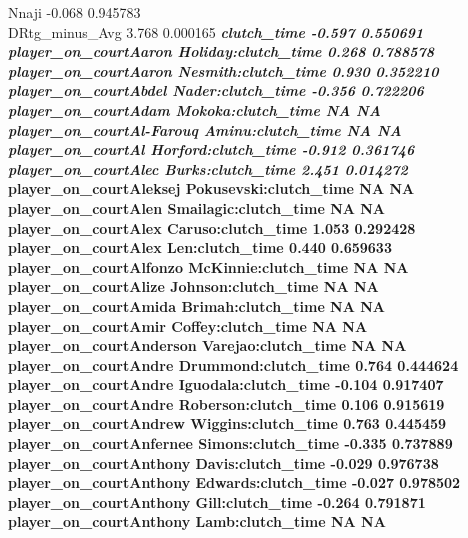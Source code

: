 \documentclass[
  landscape]{article}
\begin{document}
Nnaji -0.068 0.945783\\
DRtg\_minus\_Avg 3.768 0.000165 \textbf{\emph{ clutch\_time -0.597
0.550691\\
player\_on\_courtAaron Holiday:clutch\_time 0.268 0.788578\\
player\_on\_courtAaron Nesmith:clutch\_time 0.930 0.352210\\
player\_on\_courtAbdel Nader:clutch\_time -0.356 0.722206\\
player\_on\_courtAdam Mokoka:clutch\_time NA NA\\
player\_on\_courtAl-Farouq Aminu:clutch\_time NA NA\\
player\_on\_courtAl Horford:clutch\_time -0.912 0.361746\\
player\_on\_courtAlec Burks:clutch\_time 2.451 0.014272 }\\
player\_on\_courtAleksej Pokusevski:clutch\_time NA NA\\
player\_on\_courtAlen Smailagic:clutch\_time NA NA\\
player\_on\_courtAlex Caruso:clutch\_time 1.053 0.292428\\
player\_on\_courtAlex Len:clutch\_time 0.440 0.659633\\
player\_on\_courtAlfonzo McKinnie:clutch\_time NA NA\\
player\_on\_courtAlize Johnson:clutch\_time NA NA\\
player\_on\_courtAmida Brimah:clutch\_time NA NA\\
player\_on\_courtAmir Coffey:clutch\_time NA NA\\
player\_on\_courtAnderson Varejao:clutch\_time NA NA\\
player\_on\_courtAndre Drummond:clutch\_time 0.764 0.444624\\
player\_on\_courtAndre Iguodala:clutch\_time -0.104 0.917407\\
player\_on\_courtAndre Roberson:clutch\_time 0.106 0.915619\\
player\_on\_courtAndrew Wiggins:clutch\_time 0.763 0.445459\\
player\_on\_courtAnfernee Simons:clutch\_time -0.335 0.737889\\
player\_on\_courtAnthony Davis:clutch\_time -0.029 0.976738\\
player\_on\_courtAnthony Edwards:clutch\_time -0.027 0.978502\\
player\_on\_courtAnthony Gill:clutch\_time -0.264 0.791871\\
player\_on\_courtAnthony Lamb:clutch\_time NA NA\\
}
\end{document}
